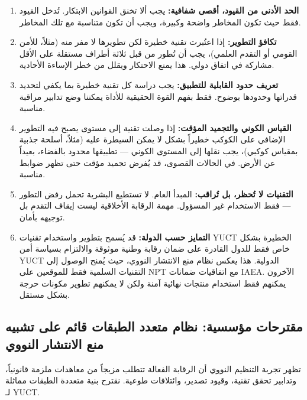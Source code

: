 \documentclass[12pt,a4paper]{article}
\theoremstyle{remark}
\begin{document}
	\begin{enumerate}[leftmargin=*]
		\item \textbf{الحد الأدنى من القيود، أقصى شفافية:} يجب ألا تخنق القوانين الابتكار. تُدخل القيود فقط حيث تكون المخاطر واضحة وكبيرة، ويجب أن تكون متناسبة مع تلك المخاطر.
		
		\item \textbf{تكافؤ التطوير:} إذا اعتُبرت تقنية خطيرة لكن تطويرها لا مفر منه (مثلاً، للأمن القومي أو التقدم العلمي)، يجب أن تُطور من قبل ثلاثة أطراف مستقلة على الأقل مشاركة في اتفاق دولي. هذا يمنع الاحتكار ويقلل من خطر الإساءة الأحادية.
		
		\item \textbf{تعريف حدود القابلية للتطبيق:} يجب دراسة كل تقنية خطيرة بما يكفي لتحديد قدراتها وحدودها بوضوح. فقط بفهم القوة الحقيقية للأداة يمكننا وضع تدابير مراقبة مناسبة.
		
		\item \textbf{القياس الكوني والتجميد المؤقت:} إذا وصلت تقنية إلى مستوى يصبح فيه التطوير الإضافي على الكوكب خطيراً بشكل لا يمكن السيطرة عليه (مثلاً، أسلحة جذبية بمقياس كوكبي)، يجب نقلها إلى المستوى الكوني — تطبيقها محدود بالفضاء، بعيداً عن الأرض. في الحالات القصوى، قد يُفرض تجميد مؤقت حتى تظهر ضوابط مناسبة.
		
		\item \textbf{التقنيات لا تُحظر، بل تُراقب:} المبدأ العام. لا تستطيع البشرية تحمل رفض التطور — فقط الاستخدام غير المسؤول. مهمة الرقابة الأخلاقية ليست إيقاف التقدم بل توجيهه بأمان.
		
		\item \textbf{التمايز حسب الدولة:} قد يُسمح بتطوير واستخدام تقنيات YUCT الخطيرة بشكل خاص فقط للدول القادرة على ضمان رقابة وطنية موثوقة والالتزام بسياسة أمن YUCT الدولية. هذا يعكس نظام منع الانتشار النووي، حيث يُمنح الوصول إلى التقنيات السلمية فقط للموقعين على NPT مع اتفاقيات ضمانات IAEA. الآخرون يمكنهم فقط استخدام منتجات نهائية آمنة ولكن لا يمكنهم تطوير مكونات حرجة بشكل مستقل.
	\end{enumerate}
	
	\subsection{مقترحات مؤسسية: نظام متعدد الطبقات قائم على تشبيه منع الانتشار النووي}
	\label{subsec:institutions}
	
	تظهر تجربة التنظيم النووي أن الرقابة الفعالة تتطلب مزيجاً من معاهدات ملزمة قانونياً، وتدابير تحقق تقنية، وقيود تصدير، وائتلافات طوعية. نقترح بنية متعددة الطبقات مماثلة لـ YUCT.
	
\end{document}
